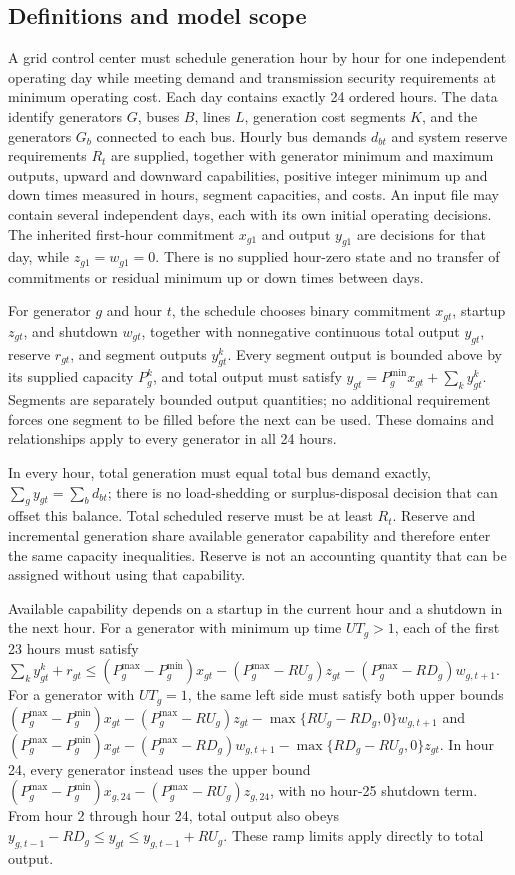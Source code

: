 \documentclass[10pt]{article}
\begin{document}
\subsection*{Definitions and model scope}
A grid control center must schedule generation hour by hour for one independent operating day while meeting demand and transmission security requirements at minimum operating cost. Each day contains exactly 24 ordered hours. The data identify generators \(G\), buses \(B\), lines \(L\), generation cost segments \(K\), and the generators \(G_b\) connected to each bus. Hourly bus demands \(d_{bt}\) and system reserve requirements \(R_t\) are supplied, together with generator minimum and maximum outputs, upward and downward capabilities, positive integer minimum up and down times measured in hours, segment capacities, and costs. An input file may contain several independent days, each with its own initial operating decisions. The inherited first-hour commitment \(x_{g1}\) and output \(y_{g1}\) are decisions for that day, while \(z_{g1}=w_{g1}=0\). There is no supplied hour-zero state and no transfer of commitments or residual minimum up or down times between days.

For generator \(g\) and hour \(t\), the schedule chooses binary commitment \(x_{gt}\), startup \(z_{gt}\), and shutdown \(w_{gt}\), together with nonnegative continuous total output \(y_{gt}\), reserve \(r_{gt}\), and segment outputs \(y^k_{gt}\). Every segment output is bounded above by its supplied capacity \(P_g^k\), and total output must satisfy \(y_{gt}=P_g^{\min}x_{gt}+\sum_k y^k_{gt}\). Segments are separately bounded output quantities; no additional requirement forces one segment to be filled before the next can be used. These domains and relationships apply to every generator in all 24 hours.

In every hour, total generation must equal total bus demand exactly, \(\sum_g y_{gt}=\sum_b d_{bt}\); there is no load-shedding or surplus-disposal decision that can offset this balance. Total scheduled reserve must be at least \(R_t\). Reserve and incremental generation share available generator capability and therefore enter the same capacity inequalities. Reserve is not an accounting quantity that can be assigned without using that capability.

Available capability depends on a startup in the current hour and a shutdown in the next hour. For a generator with minimum up time \(UT_g>1\), each of the first 23 hours must satisfy \(\sum_k y^k_{gt}+r_{gt}\le(P_g^{\max}-P_g^{\min})x_{gt}-(P_g^{\max}-RU_g)z_{gt}-(P_g^{\max}-RD_g)w_{g,t+1}\). For a generator with \(UT_g=1\), the same left side must satisfy both upper bounds \( (P_g^{\max}-P_g^{\min})x_{gt}-(P_g^{\max}-RU_g)z_{gt}-\max\{RU_g-RD_g,0\}w_{g,t+1}\) and \( (P_g^{\max}-P_g^{\min})x_{gt}-(P_g^{\max}-RD_g)w_{g,t+1}-\max\{RD_g-RU_g,0\}z_{gt}\). In hour 24, every generator instead uses the upper bound \( (P_g^{\max}-P_g^{\min})x_{g,24}-(P_g^{\max}-RU_g)z_{g,24}\), with no hour-25 shutdown term. From hour 2 through hour 24, total output also obeys \(y_{g,t-1}-RD_g\le y_{gt}\le y_{g,t-1}+RU_g\). These ramp limits apply directly to total output.
\end{document}

